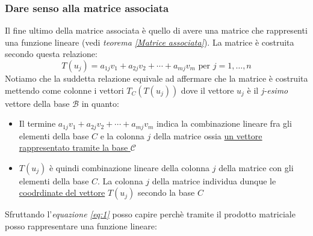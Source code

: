 \subsubsection*{Dare senso alla matrice associata}
Il fine ultimo della matrice associata è quello di avere una matrice che rappresenti una funzione lineare (vedi \textit{teorema  \ref{Matrice associata}}). La matrice è costruita secondo questa relazione:
\begin{equation} \label{eq:1}
	T\left(u_j\right)=a_{1 j} v_1+a_{2 j} v_2+\cdots+a_{m j} v_m \text{ per } j=1, \ldots, n
\end{equation}
Notiamo che la suddetta relazione equivale ad affermare che la matrice è costruita mettendo come colonne i vettori $ T_C \left( T\left( u_j \right)  \right)  $ dove il vettore $ u_j $ è il \textit{j-esimo} vettore della base $ \mathcal{B} $ in quanto:
\begin{itemize}
	\item  Il termine $ a_{1 j} v_1+a_{2 j} v_2+\cdots+a_{m j} v_m  $ indica la combinazione lineare fra gli elementi della base $ C $ e la colonna $ j $ della matrice ossia \underline{un vettore rappresentato tramite la base $ \mathcal{C} $}
	\item $ T\left( u_j \right)  $ è quindi combinazione lineare della colonna $ j $ della matrice con gli elementi della base $ C $. La colonna $ j $ della matrice individua dunque le \underline{coodrdinate del vettore} $ T\left( u_j \right)  $ secondo la base $ C $
\end{itemize}
Sfruttando l'\textit{equazione \ref{eq:1}} posso capire perchè tramite il prodotto matriciale posso rappresentare una funzione lineare:
